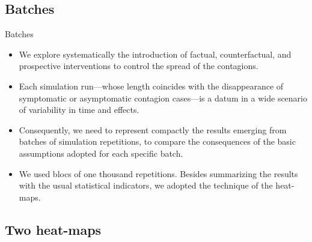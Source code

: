 \documentclass[8pt]{beamer}
\begin{document}
\subsection{Batches}

\begin{frame}{Batches}

  \begin{itemize}
  \item

We explore systematically the introduction of factual, counterfactual, and prospective interventions to control the spread of the contagions. 

  \item
Each simulation run---whose length coincides with the disappearance of symptomatic or asymptomatic contagion cases---is a datum in a wide scenario of variability in time and effects.   
  
  \item
  
Consequently, we need to represent compactly the results  emerging from batches of simulation repetitions, to compare the  consequences of the basic assumptions adopted for each specific batch.

 \item
We used blocs of one thousand repetitions. Besides summarizing the results with the usual statistical indicators, we adopted the technique of the heat-maps.

\end{itemize}
\end{frame}

\subsection{Two heat-maps}
\end{document}
